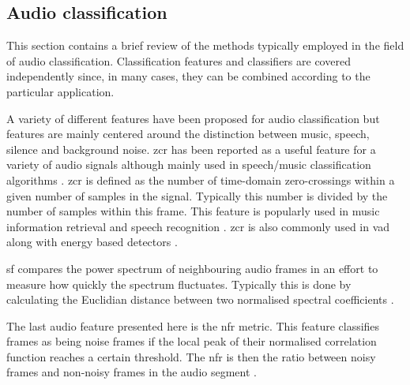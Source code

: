 %

\subsection{Audio classification}
This section contains a brief review of the methods typically employed in the field of audio classification. Classification features and classifiers are covered independently since, in many cases, they can be combined according to the particular application.

A variety of different features have been proposed for audio classification but features are mainly centered around the distinction between music, speech, silence and background noise. \gls{zcr} has been reported as a useful feature for a variety of audio signals although mainly used in speech/music classification algorithms \cite{Lu2002}. \gls{zcr} is defined as the number of time-domain zero-crossings within a given number of samples in the signal. Typically this number is divided by the number of samples within this frame. This feature is popularly used in music information retrieval and speech recognition \cite{Saraceno1997}\cite{Scheirer1997}\cite{Gouyon2000}. \gls{zcr} is also commonly used in \gls{vad} along with energy based detectors \cite{Sangwan2002}.

\gls{sf} compares the power spectrum of neighbouring audio frames in an effort to measure how quickly the spectrum fluctuates. Typically this is done by calculating the Euclidian distance between two normalised spectral coefficients \cite{Wang2012}.

The last audio feature presented here is the \gls{nfr} metric. This feature classifies frames as being noise frames if the local peak of their normalised correlation function reaches a certain threshold. The \gls{nfr} is then the ratio between noisy frames and non-noisy frames in the audio segment \cite{Lu2002}\cite{Jiang2000}.

